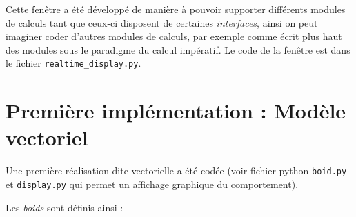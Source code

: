 \documentclass[
]{article}
\begin{document}
Cette fenêtre a été développé de manière à pouvoir supporter différents
modules de calculs tant que ceux-ci disposent de certaines
\emph{interfaces}, ainsi on peut imaginer coder d'autres modules de
calculs, par exemple comme écrit plus haut des modules sous le paradigme
du calcul impératif. Le code de la fenêtre est dans le fichier
\texttt{realtime\_display.py}.

\hypertarget{premiuxe8re-impluxe9mentation-moduxe8le-vectoriel}{%
\section{Première implémentation : Modèle
vectoriel}\label{premiuxe8re-impluxe9mentation-moduxe8le-vectoriel}}

Une première réalisation dite vectorielle a été codée (voir fichier
python \texttt{boid.py} et \texttt{display.py} qui permet un affichage
graphique du comportement).

Les \emph{boids} sont définis ainsi :
\end{document}
